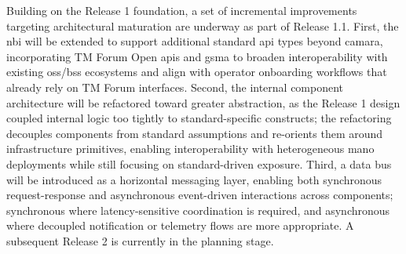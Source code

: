 Building on the Release 1 foundation, a set of incremental improvements targeting architectural maturation are underway as part of Release 1.1. First, the \ac{nbi} will be extended to support additional standard \ac{api} types beyond \ac{camara}, incorporating TM Forum Open \acp{api} and \ac{gsma} to broaden interoperability with existing \ac{oss}/\ac{bss} ecosystems and align with operator onboarding workflows that already rely on TM Forum interfaces. Second, the internal component architecture will be refactored toward greater abstraction, as the Release 1 design coupled internal logic too tightly to standard-specific constructs; the refactoring decouples components from standard assumptions and re-orients them around infrastructure primitives, enabling interoperability with heterogeneous \ac{mano} deployments while still focusing on standard-driven exposure. Third, a data bus will be introduced as a horizontal messaging layer, enabling both synchronous request-response and asynchronous event-driven interactions across components; synchronous where latency-sensitive coordination is required, and asynchronous where decoupled notification or telemetry flows are more appropriate. A subsequent Release 2 is currently in the planning stage.